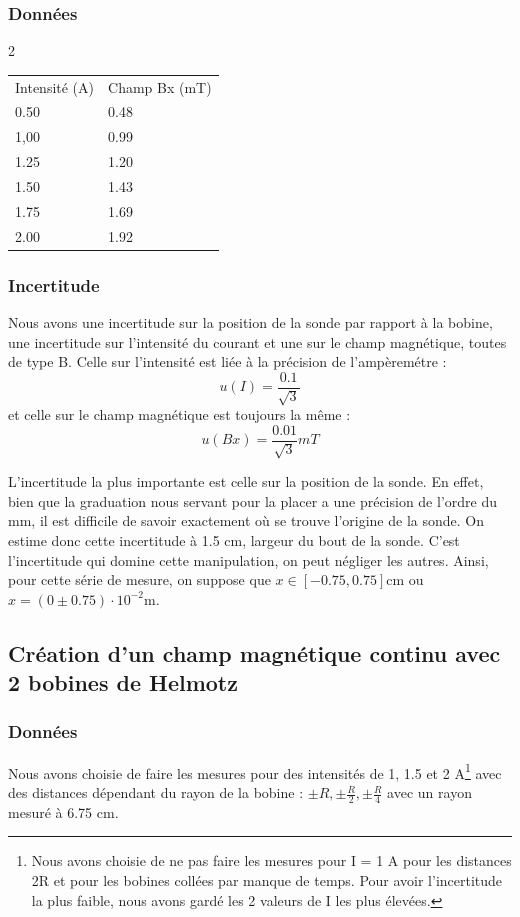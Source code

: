 \documentclass[a4paper,9pt,french]{scrartcl}
\begin{document}
\subsubsection{Données}
\begin{multicols}{2}
\begin{center}
\begin{tabular}{ll}
Intensité (A) & Champ Bx (mT)\\
0.50 & 0.48\\
1,00 & 0.99\\
1.25 & 1.20\\
1.50 & 1.43\\
1.75 & 1.69\\
2.00 & 1.92
\end{tabular}
\end{center}

\subsubsection{Incertitude}
Nous avons une incertitude sur la position de la sonde par rapport à la bobine, une incertitude sur l'intensité du courant et une sur le champ magnétique, toutes de type B. Celle sur l'intensité est liée à la précision de l'ampèremétre : \[u(I) = \frac{0.1}{\sqrt{3}}\] %
et celle sur le champ magnétique est toujours la m\^eme : \[u(Bx) = \frac{0.01}{\sqrt{3}}mT\]
\end{multicols}
L'incertitude la plus importante est celle sur la position de la sonde. En effet, bien que la graduation nous servant pour la placer a une précision de l'ordre du mm, il est difficile de savoir exactement où se trouve l'origine de la sonde. On estime donc cette incertitude à 1.5 cm, largeur du bout de la sonde. C'est l'incertitude qui domine cette manipulation, on peut négliger les autres. Ainsi, pour cette série de mesure, on suppose que \(x\in[-0.75, 0.75]\)cm ou \(x = (0\pm 0.75)\cdot 10^{-2}\)m.
\subsection{Création d'un champ magnétique continu avec 2 bobines de Helmotz}
\subsubsection{Données}
Nous avons choisie de faire les mesures pour des intensités de 1, 1.5 et 2 A\footnote{Nous avons choisie de ne pas faire les mesures pour I = 1 A pour les distances 2R et pour les bobines collées par manque de temps. Pour avoir l'incertitude la plus faible, nous avons gardé les 2 valeurs de I les plus élevées.} avec des distances dépendant du rayon de la bobine : \(\pm R, \pm \frac{R}{2}, \pm \frac{R}{4}\) avec un rayon mesuré à 6.75 cm.
\end{document}
